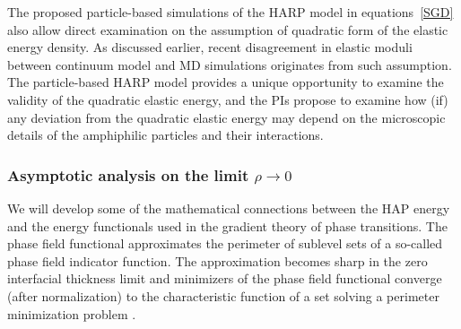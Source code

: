 The proposed particle-based simulations of the HARP model in equations~\ref{SGD} also allow direct examination on the assumption of quadratic form of the elastic energy density.
As discussed earlier, recent disagreement in elastic moduli between continuum model and MD simulations originates from such assumption. 
The particle-based HARP model provides a unique opportunity to examine the validity of the quadratic elastic energy, and the PIs propose to examine how (if) any deviation from the quadratic elastic energy may depend on the microscopic details of the amphiphilic particles and their interactions.

 

\subsubsection{Asymptotic analysis on the limit $\rho\rightarrow 0$}

We will develop some of the mathematical connections between the HAP energy and the energy functionals used in the gradient theory of phase transitions. 
The phase field functional approximates the perimeter of sublevel sets of a so-called phase field indicator function. 
The approximation becomes sharp in the zero interfacial thickness limit and minimizers of the phase field functional converge (after normalization) 
to the characteristic function of a set solving a perimeter minimization problem 
\cite{Modica87, MODICA1987487, LuMo89}. 


